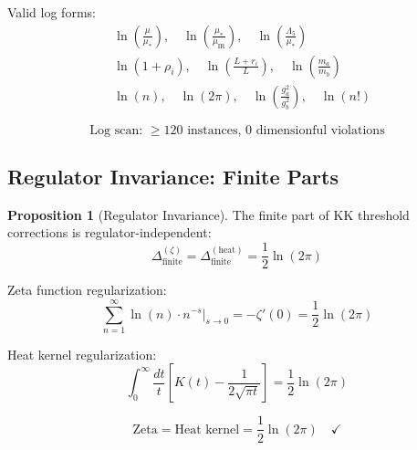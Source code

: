 \documentclass[11pt,a4paper]{article}
\theoremstyle{definition}
\newtheorem{proposition}[theorem]{Proposition}
\begin{document}
Valid log forms:
\begin{align}
\label{eq:log_forms_1}
&\ln\left(\frac{\mu}{\mu_*}\right), \quad \ln\left(\frac{\mu_*}{\mu_{\text{IR}}}\right), \quad \ln\left(\frac{\Lambda_5}{\mu_*}\right) \\
\label{eq:log_forms_2}
&\ln(1 + \rho_i), \quad \ln\left(\frac{L + r_i}{L}\right), \quad \ln\left(\frac{m_a}{m_b}\right) \\
\label{eq:log_forms_3}
&\ln(n), \quad \ln(2\pi), \quad \ln\left(\frac{g_a^2}{g_b^2}\right), \quad \ln(n!)
\end{align}

\begin{equation}
\label{eq:log_scan}
\boxed{\text{Log scan: } \geq 120 \text{ instances, } 0 \text{ dimensionful violations}}
\end{equation}

\subsection{Regulator Invariance: Finite Parts}
\label{subsec:regulator_inv}

\begin{proposition}[Regulator Invariance]
\label{prop:regulator}
The finite part of KK threshold corrections is regulator-independent:
\begin{equation}
\label{eq:reg_inv}
\Delta^{(\zeta)}_{\text{finite}} = \Delta^{(\text{heat})}_{\text{finite}} = \frac{1}{2}\ln(2\pi)
\end{equation}
\end{proposition}

Zeta function regularization:
\begin{equation}
\label{eq:zeta_reg}
\sum_{n=1}^{\infty}\ln(n) \cdot n^{-s}\Big|_{s \to 0} = -\zeta'(0) = \frac{1}{2}\ln(2\pi)
\end{equation}

Heat kernel regularization:
\begin{equation}
\label{eq:heat_reg}
\int_0^{\infty}\frac{dt}{t}\left[K(t) - \frac{1}{2\sqrt{\pi t}}\right] = \frac{1}{2}\ln(2\pi)
\end{equation}

\begin{equation}
\label{eq:regulator_check}
\boxed{\text{Zeta} = \text{Heat kernel} = \frac{1}{2}\ln(2\pi)} \quad \checkmark
\end{equation}
\end{document}
